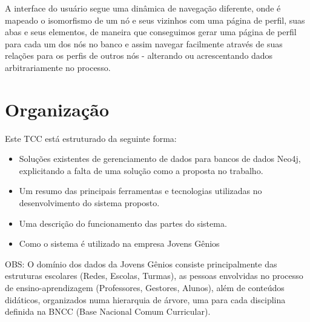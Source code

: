 A interface do usuário segue uma dinâmica de navegação diferente, onde é mapeado o isomorfismo de um nó e seus vizinhos com uma página de perfil, suas abas e seus elementos, de maneira que conseguimos gerar uma página de perfil para cada um dos nós no banco e assim navegar facilmente através de suas relações para os perfis de outros nós - alterando ou acrescentando dados arbitrariamente no processo.

\section{Organização}

Este TCC está estruturado da seguinte forma:
\begin{itemize}
  \item Soluções existentes de gerenciamento de dados para bancos de dados Neo4j, explicitando a falta de uma solução como a proposta no trabalho.
  \item Um resumo das principais ferramentas e tecnologias utilizadas no desenvolvimento do sistema proposto.
  \item Uma descrição do funcionamento das partes do sistema.
  \item Como o sistema é utilizado na empresa Jovens Gênios
\end{itemize}

OBS: O domínio dos dados da Jovens Gênios consiste principalmente das estruturas escolares (Redes, Escolas, Turmas), as pessoas envolvidas no processo de ensino-aprendizagem (Professores, Gestores, Alunos), além de conteúdos didáticos, organizados numa hierarquia de árvore, uma para cada disciplina definida na BNCC (Base Nacional Comum Curricular).

